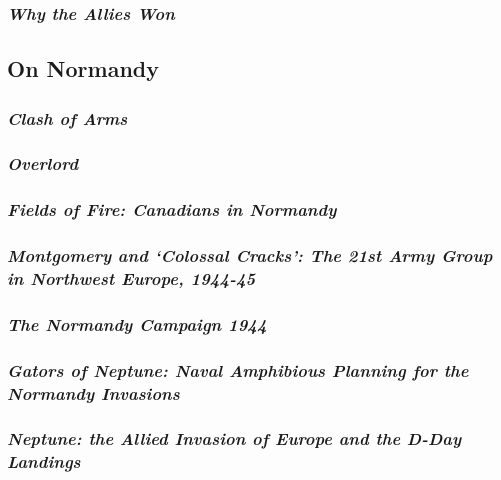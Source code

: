 \documentclass[noraggedright]{turabian-researchpaper}
\begin{document}
		\subsubsection{\textit{Why the Allies Won}}

	\subsection{On Normandy}


		\subsubsection{\textit{Clash of Arms}}
		\subsubsection{\textit{Overlord}}
		\subsubsection{\textit{Fields of Fire:  Canadians in 
			Normandy}}

			
		\subsubsection{\textit{Montgomery and `Colossal Cracks':  
			The 21st Army Group in Northwest Europe, 1944-45}}
		\subsubsection{\textit{The Normandy Campaign 1944}}
		\subsubsection{\textit{Gators of Neptune: Naval Amphibious
			Planning for the Normandy Invasions}}
		\subsubsection{\textit{Neptune:  the Allied Invasion of 
			Europe and the D-Day Landings}}
\end{document}
